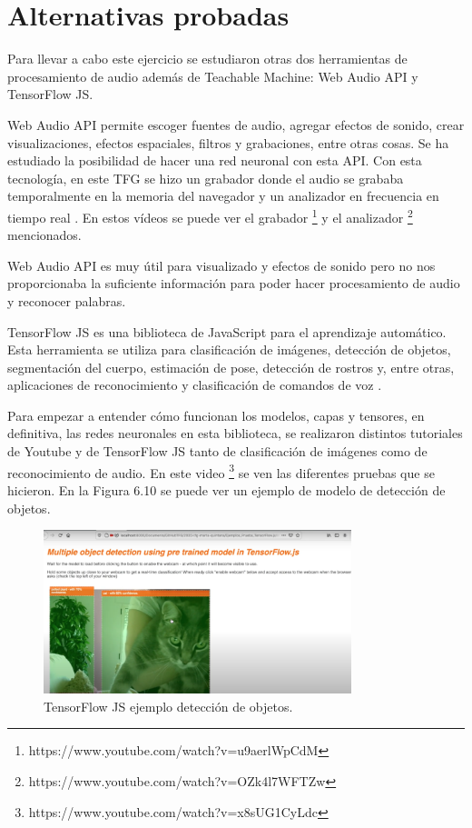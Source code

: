 \section{Alternativas probadas}

Para llevar a cabo este ejercicio se estudiaron otras dos herramientas de procesamiento de audio además de Teachable Machine: Web Audio API y TensorFlow JS.

Web Audio API permite escoger fuentes de audio, agregar efectos de sonido, crear visualizaciones, efectos espaciales, filtros y grabaciones, entre otras cosas.
Se ha estudiado la  posibilidad de hacer una red neuronal con esta API. Con esta tecnología, en este TFG se hizo un grabador donde el audio se grababa temporalmente en la memoria del navegador y un analizador en frecuencia en tiempo real \cite{waa} .  En estos vídeos se puede ver el grabador \footnote{https://www.youtube.com/watch?v=u9aerlWpCdM} y el analizador \footnote{https://www.youtube.com/watch?v=OZk4l7WFTZw} mencionados.

Web Audio API es muy útil para visualizado y efectos de sonido pero no nos proporcionaba la suficiente información para poder hacer procesamiento de audio y reconocer palabras.

TensorFlow JS es una biblioteca de JavaScript para el aprendizaje automático. Esta herramienta se utiliza para clasificación de imágenes, detección de objetos, segmentación del cuerpo, estimación de pose, detección de rostros y, entre otras, aplicaciones de reconocimiento y clasificación de comandos de voz \cite{tensorflowmodel}.

Para empezar a entender cómo funcionan los modelos, capas y  tensores, en definitiva,  las redes neuronales en esta biblioteca, se realizaron distintos tutoriales de Youtube y de TensorFlow JS tanto de clasificación de imágenes como de reconocimiento de audio. En este video \footnote{https://www.youtube.com/watch?v=x8sUG1CyLdc} se ven las diferentes pruebas que se hicieron. En la Figura 6.10 se puede ver un ejemplo de modelo de detección de objetos.

\begin{figure}[H]
    \centering
    \includegraphics[width=0.8\textwidth, height=0.4\textwidth]{chapters/images/imagerecognition.png}
    \caption{TensorFlow JS ejemplo detección de objetos. }
    \label{fig:my_label}
\end{figure}

